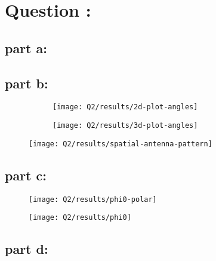 \documentclass[12pt,onecolumn,a4paper]{article}
\newcommand\question{\section{Question \numberstringnum{\thesection}:}}
\begin{document}
	
	
	\FloatBarrier
	\question%
	
	
	\FloatBarrier
	\subsection{part a:}
	
	
	\FloatBarrier
	\subsection{part b:}
	
	
	\begin{figure}[h]
		\begin{subfigure}{.43\linewidth}
			\centering
			\texttt{[image: Q2/results/2d-plot-angles]}
			\caption{}
			\label{fig:2d-plot-angles}
		\end{subfigure}
		\hfill
		\begin{subfigure}{.5\linewidth}
			\centering
			\texttt{[image: Q2/results/3d-plot-angles]}
			\caption{}
			\label{fig:3d-plot-angles}
		\end{subfigure}
	\end{figure}
	
	
	\begin{figure}[h]
		\centering
		\texttt{[image: Q2/results/spatial-antenna-pattern]}
		\caption{}
		\label{fig:spatial-antenna-pattern}
	\end{figure}
	
	\FloatBarrier
	\subsection{part c:}
	
	\begin{figure}[h]
		\centering
		\texttt{[image: Q2/results/phi0-polar]}
		\caption{}
		\label{fig:phi0-polar}
	\end{figure}
	
	
	\begin{figure}[h]
		\centering
		\texttt{[image: Q2/results/phi0]}
		\caption{}
		\label{fig:phi0}
	\end{figure}
	
	\FloatBarrier
	\subsection{part d:}
	
\end{document}
